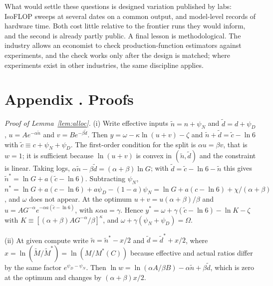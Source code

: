 \documentclass[AER,finalmode]{AEA}
\theoremstyle{definition}
\theoremstyle{remark}
\begin{document}
What would settle these questions is designed variation published by labs: IsoFLOP sweeps at several dates on a common
output, and model-level records of hardware time. Both cost little relative to the frontier runs they would
inform, and the second is already partly public. A final lesson is methodological. The industry allows an economist to check
production-function estimators against experiments, and the check works only after the design is matched; where
experiments exist in other industries, the same discipline applies.




\clearpage
\appendix
\makeatletter\renewcommand\p@subsection{}\makeatother
\renewcommand{\theHtable}{\thetable}\renewcommand{\theHfigure}{\thefigure}\renewcommand{\theHequation}{\theequation}

\section[Proofs]{Appendix \thesection. Proofs}\label{app:proofs}

\textit{Proof of Lemma~\ref{lem:alloc}.} (i) Write effective inputs $\tilde n=n+\psi_N$ and $\tilde d=d+\psi_D$,
$u=Ae^{-\alpha\tilde n}$ and $v=Be^{-\beta\tilde d}$. Then $y=\omega-\kappa\ln(u+v)-\zeta$ and
$\tilde n+\tilde d=\tilde c-\ln6$ with $\tilde c\equiv c+\psi_N+\psi_D$. The first-order condition for the split is
$\alpha u=\beta v$, that is $w=1$; it is sufficient because $\ln(u+v)$ is convex in $(\tilde n,\tilde d)$ and the
constraint is linear. Taking logs, $\alpha\tilde n-\beta\tilde d=(\alpha+\beta)\ln G$; with
$\tilde d=\tilde c-\ln6-\tilde n$ this gives $\tilde n^*=\ln G+a(\tilde c-\ln6)$. Subtracting $\psi_N$,
$n^*=\ln G+a(c-\ln6)+a\psi_D-(1-a)\psi_N=\ln G+a(c-\ln6)+\chi/(\alpha+\beta)$, and $\omega$ does not appear. At the
optimum $u+v=u(\alpha+\beta)/\beta$ and $u=AG^{-\alpha}e^{-\alpha a(\tilde c-\ln6)}$, with $\kappa\alpha a=\gamma$.
Hence $y^*=\omega+\gamma(\tilde c-\ln6)-\ln K-\zeta$ with $K\equiv[(\alpha+\beta)AG^{-\alpha}/\beta]^\kappa$, and
$\omega+\gamma(\psi_N+\psi_D)=\Omega$.

(ii) At given compute write $\tilde n=\tilde n^*-x/2$ and $\tilde d=\tilde d^*+x/2$, where
$x=\ln(\tilde M/\tilde M^*)=\ln(M/M^*(C))$ because effective and actual ratios differ by the same factor
$e^{\psi_D-\psi_N}$. Then $\ln w=\ln(\alpha A/\beta B)-\alpha\tilde n+\beta\tilde d$, which is zero at the optimum and
changes by $(\alpha+\beta)x/2$.
\end{document}
